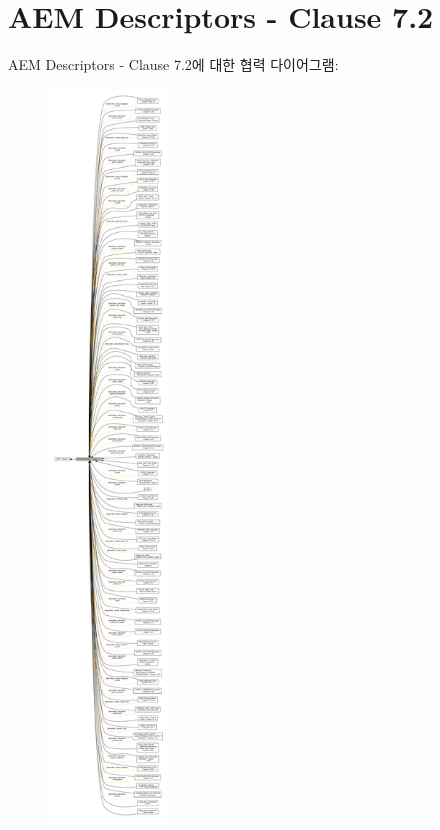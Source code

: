 \hypertarget{group__aem__descriptor}{}\section{A\+EM Descriptors -\/ Clause 7.2}
\label{group__aem__descriptor}
A\+EM Descriptors -\/ Clause 7.2에 대한 협력 다이어그램\+:
\nopagebreak
\begin{figure}[H]
\begin{center}
\leavevmode
\includegraphics[height=550pt]{group__aem__descriptor}
\end{center}
\end{figure}
